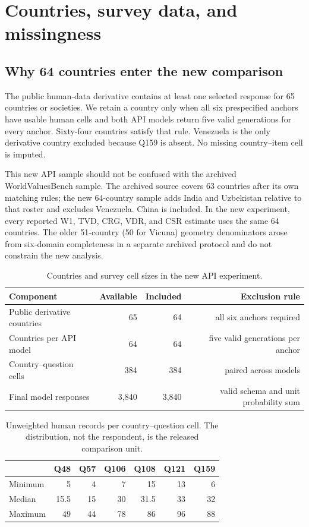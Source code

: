 \section{Countries, survey data, and missingness}
\label{app:data}

\subsection{Why 64 countries enter the new comparison}
The public human-data derivative contains at least one selected response for 65 countries or
societies. We retain a country only when all six prespecified anchors have usable human
cells and both API models return five valid generations for every anchor. Sixty-four
countries satisfy that rule. Venezuela is the only derivative country excluded because
Q159 is absent. No missing country--item cell is imputed.

This new API sample should not be confused with the archived WorldValuesBench sample.
The archived source covers 63 countries after its own matching rules; the new 64-country
sample adds India and Uzbekistan relative to that roster and excludes Venezuela. China is
included. In the new experiment, every reported W1, TVD, CRG, VDR, and CSR estimate uses
the same 64 countries. The older 51-country (50 for Vicuna) geometry denominators arose
from six-domain completeness in a separate archived protocol and do not constrain the new
analysis.

\begin{table}[!htbp]
\centering
\caption{Countries and survey cell sizes in the new API experiment.}
\label{tab:coverage-summary}
\small
\begin{tabular}{lrrr}
\toprule
\rowcolor{tablehead}
Component & Available & Included & Exclusion rule \\
\midrule
Public derivative countries & 65 & 64 & all six anchors required \\
Countries per API model & 64 & 64 & five valid generations per anchor \\
Country--question cells & 384 & 384 & paired across models \\
Final model responses & 3,840 & 3,840 & valid schema and unit probability sum \\
\bottomrule
\end{tabular}
\end{table}

\begin{table}[!htbp]
\centering
\caption{Unweighted human records per country--question cell. The distribution, not
the respondent, is the released comparison unit.}
\label{tab:human-cell-counts}
\small
\begin{tabular}{lrrrrrr}
\toprule
\rowcolor{tablehead}
 & Q48 & Q57 & Q106 & Q108 & Q121 & Q159 \\
\midrule
Minimum & 5 & 4 & 7 & 15 & 13 & 6 \\
Median & 15.5 & 15 & 30 & 31.5 & 33 & 32 \\
Maximum & 49 & 44 & 78 & 86 & 96 & 88 \\
\bottomrule
\end{tabular}
\end{table}

